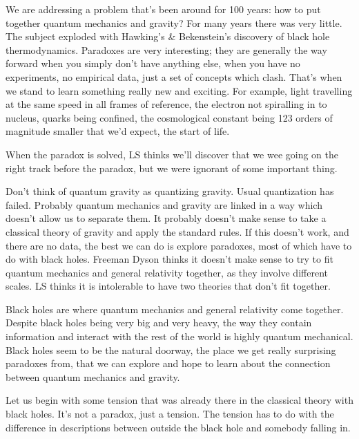 \documentclass[]{article}
\begin{document}
{\begin{appendices}
	We are addressing a problem that's been around for 100 years: how to put together quantum mechanics and gravity?  For many years there was very little. The subject exploded with Hawking's \& Bekenstein's discovery of black hole thermodynamics. Paradoxes are very interesting; they are generally the way forward when you simply don't have anything else, when you have no experiments, no empirical data, just a set of concepts which clash. That's when we stand to learn something really new and exciting. For example, light travelling at the same speed in all frames of reference, the electron not spiralling in to nucleus, quarks being confined, the cosmological constant being 123 orders of magnitude smaller that we'd expect, the start of life.\cite{susskind2013inside}
	
	When the paradox is solved, LS thinks we'll discover that we wee going on the right track before the paradox, but we were ignorant of some important thing.
	
	Don't think of quantum gravity as quantizing gravity. Usual quantization has failed. Probably quantum mechanics and gravity are linked in a way which doesn't allow us to separate them. It probably doesn't make sense to take a classical theory of gravity and apply the standard rules. If this doesn't work, and there are no data, the best we can do is explore paradoxes, most of which have to do with black holes. Freeman Dyson thinks it doesn't make sense to try to fit quantum mechanics and general relativity together, as they involve different scales. LS thinks it is intolerable to have two theories that don't fit together. 
	
	Black holes are where quantum mechanics and general relativity come together. Despite black holes being very big and very heavy, the way they contain information and interact with the rest of the world is highly quantum mechanical. Black holes seem to be the natural doorway, the place we get really surprising paradoxes from, that we can explore and hope to learn about the connection between quantum mechanics and gravity.
	
	Let us begin with some tension that was already there in the classical theory with black holes. It's not a paradox, just a tension. The tension has to do with the difference in descriptions between outside the black hole and somebody falling in.
	

\end{appendices}}
\end{document}
